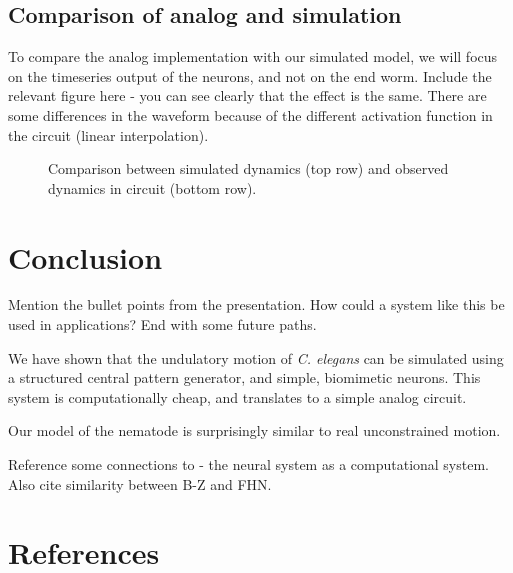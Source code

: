 \documentclass[
    11pt,
]{article}
\begin{document}
\subsection{Comparison of analog and simulation}

To compare the analog implementation with our simulated model, we will focus on the timeseries output of the neurons, and not on the end worm.  Include the relevant figure here - you can see clearly that the effect is the same.  There are some differences in the waveform because of the different activation function in the circuit (linear interpolation).

\begin{figure}[h!]
    \centering
    \pgfplotsset{}
    \caption{Comparison between simulated dynamics (top row) and observed dynamics in circuit (bottom row).}
    \label{fig: anal_sim_comp}
\end{figure}


\section{Conclusion}

Mention the bullet points from the presentation.  How could a system like this be used in applications?  End with some future paths.

We have shown that the undulatory motion of \emph{C. elegans} can be simulated using a structured central pattern generator, and simple, biomimetic neurons.  This system is computationally cheap, and translates to a simple analog circuit.  

Our model of the nematode is surprisingly similar to real unconstrained motion.



Reference some connections to \citet{adamatzky2008} - the neural system as a computational system.  Also cite similarity between B-Z and FHN.

\section{References}

% 
\printbibliography[heading=none]
\end{document}
